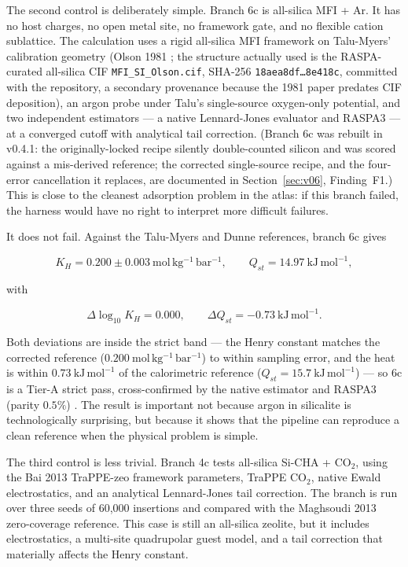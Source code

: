 The second control is deliberately simple. Branch 6c is all-silica MFI + Ar. It has no host charges, no open metal site, no framework gate, and no flexible cation sublattice. The calculation uses a rigid all-silica MFI framework on Talu-Myers' calibration geometry (Olson 1981 \cite{Olson1981JPC}; the structure actually used is the RASPA-curated all-silica CIF \texttt{MFI\_SI\_Olson.cif}, SHA-256 \texttt{18aea8df\ldots8e418c}, committed with the repository, a secondary provenance because the 1981 paper predates CIF deposition), an argon probe under Talu's single-source oxygen-only potential, and two independent estimators --- a native Lennard-Jones evaluator and RASPA3 --- at a converged cutoff with analytical tail correction. (Branch 6c was rebuilt in v0.4.1: the originally-locked recipe silently double-counted silicon and was scored against a mis-derived reference; the corrected single-source recipe, and the four-error cancellation it replaces, are documented in Section~\ref{sec:v06}, Finding~F1.) This is close to the cleanest adsorption problem in the atlas: if this branch failed, the harness would have no right to interpret more difficult failures.

It does not fail. Against the Talu-Myers and Dunne references, branch 6c gives

\[
K_H = 0.200 \pm 0.003\ \mathrm{mol\,kg^{-1}\,bar^{-1}},
\qquad
Q_{st} = 14.97\ \mathrm{kJ\,mol^{-1}},
\]

with

\[
\Delta \log_{10} K_H = 0.000,
\qquad
\Delta Q_{st} = -0.73\ \mathrm{kJ\,mol^{-1}}.
\]

Both deviations are inside the strict band --- the Henry constant matches the corrected reference (\(0.200\ \mathrm{mol\,kg^{-1}\,bar^{-1}}\)) to within sampling error, and the heat is within \(0.73\ \mathrm{kJ\,mol^{-1}}\) of the calorimetric reference (\(Q_{st} = 15.7\ \mathrm{kJ\,mol^{-1}}\)) --- so 6c is a Tier-A strict pass, cross-confirmed by the native estimator and RASPA3 (parity \(0.5\%\)) \cite{Talu2001,Dunne1996Langmuir}. The result is important not because argon in silicalite is technologically surprising, but because it shows that the pipeline can reproduce a clean reference when the physical problem is simple.

The third control is less trivial. Branch 4c tests all-silica Si-CHA + CO\(_2\), using the Bai 2013 TraPPE-zeo framework parameters, TraPPE CO\(_2\), native Ewald electrostatics, and an analytical Lennard-Jones tail correction. The branch is run over three seeds of 60,000 insertions and compared with the Maghsoudi 2013 zero-coverage reference. This case is still an all-silica zeolite, but it includes electrostatics, a multi-site quadrupolar guest model, and a tail correction that materially affects the Henry constant.

